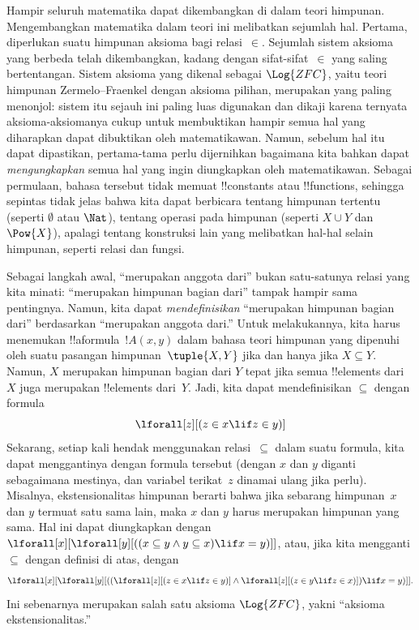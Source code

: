 \documentclass[../../../include/open-logic-section]{subfiles}
\begin{document}


Hampir seluruh matematika dapat dikembangkan di dalam teori himpunan.
Mengembangkan matematika dalam teori ini melibatkan sejumlah hal. Pertama,
diperlukan suatu himpunan aksioma bagi relasi~$\in$. Sejumlah sistem aksioma
yang berbeda telah dikembangkan, kadang dengan sifat-sifat~$\in$ yang saling
bertentangan. Sistem aksioma yang dikenal sebagai $\Log{ZFC}$, yaitu teori
himpunan Zermelo--Fraenkel dengan aksioma pilihan, merupakan yang paling
menonjol: sistem itu sejauh ini paling luas digunakan dan dikaji karena
ternyata aksioma-aksiomanya cukup untuk membuktikan hampir semua hal yang
diharapkan dapat dibuktikan oleh matematikawan. Namun, sebelum hal itu dapat
dipastikan, pertama-tama perlu dijernihkan bagaimana kita bahkan dapat
\emph{mengungkapkan} semua hal yang ingin diungkapkan oleh matematikawan.
Sebagai permulaan, bahasa tersebut tidak memuat !!{constant}s atau
!!{function}s, sehingga sepintas tidak jelas bahwa kita dapat berbicara
tentang himpunan tertentu (seperti $\emptyset$ atau $\Nat$), tentang operasi
pada himpunan (seperti $X \cup Y$ dan $\Pow{X}$), apalagi tentang konstruksi
lain yang melibatkan hal-hal selain himpunan, seperti relasi dan fungsi.

Sebagai langkah awal, ``merupakan anggota dari'' bukan satu-satunya relasi
yang kita minati: ``merupakan himpunan bagian dari'' tampak hampir sama
pentingnya. Namun, kita dapat \emph{mendefinisikan} ``merupakan himpunan
bagian dari'' berdasarkan ``merupakan anggota dari.'' Untuk melakukannya, kita
harus menemukan !!a{formula}~$!A(x, y)$ dalam bahasa teori himpunan yang
dipenuhi oleh suatu pasangan himpunan~$\tuple{X, Y}$ jika dan hanya jika
$X \subseteq Y$. Namun, $X$ merupakan himpunan bagian dari $Y$ tepat jika
semua !!{element}s dari~$X$ juga merupakan !!{element}s dari~$Y$. Jadi, kita
dapat mendefinisikan $\subseteq$ dengan formula
\[
\lforall[z][(z \in x \lif z \in y)]
\]
Sekarang, setiap kali hendak menggunakan relasi~$\subseteq$ dalam suatu
formula, kita dapat menggantinya dengan formula tersebut (dengan $x$ dan $y$
diganti sebagaimana mestinya, dan variabel terikat~$z$ dinamai ulang jika
perlu). Misalnya, ekstensionalitas himpunan berarti bahwa jika sebarang
himpunan~$x$ dan $y$ termuat satu sama lain, maka $x$ dan $y$ harus merupakan
himpunan yang sama. Hal ini dapat diungkapkan dengan
$\lforall[x][\lforall[y][((x \subseteq y \land y \subseteq x) \lif x =
y)]]$, atau, jika kita mengganti $\subseteq$ dengan definisi di atas, dengan
\[
\lforall[x][\lforall[y][((\lforall[z][(z \in x \lif z \in y)] \land
    \lforall[z][(z \in y \lif z \in x)]) \lif x = y)]].
\]
Ini sebenarnya merupakan salah satu aksioma $\Log{ZFC}$, yakni ``aksioma
ekstensionalitas.''
\end{document}
